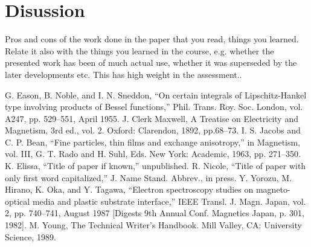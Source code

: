 \documentclass[conference]{IEEEtran}
\begin{document}
\section{Disussion}
Pros and cons of the work done in the paper that you read, things you learned. Relate it also with the things you learned in the course, e.g. whether the presented work has been of much actual use, whether it was superseded by the later developments etc. This has high weight in the assessment..
%
%
%
%
\begin{thebibliography}{00}
 G. Eason, B. Noble, and I. N. Sneddon, ``On certain integrals of Lipschitz-Hankel type involving products of Bessel functions,'' Phil. Trans. Roy. Soc. London, vol. A247, pp. 529--551, April 1955.
 J. Clerk Maxwell, A Treatise on Electricity and Magnetism, 3rd ed., vol. 2. Oxford: Clarendon, 1892, pp.68--73.
 I. S. Jacobs and C. P. Bean, ``Fine particles, thin films and exchange anisotropy,'' in Magnetism, vol. III, G. T. Rado and H. Suhl, Eds. New York: Academic, 1963, pp. 271--350.
 K. Elissa, ``Title of paper if known,'' unpublished.
 R. Nicole, ``Title of paper with only first word capitalized,'' J. Name Stand. Abbrev., in press.
 Y. Yorozu, M. Hirano, K. Oka, and Y. Tagawa, ``Electron spectroscopy studies on magneto-optical media and plastic substrate interface,'' IEEE Transl. J. Magn. Japan, vol. 2, pp. 740--741, August 1987 [Digests 9th Annual Conf. Magnetics Japan, p. 301, 1982].
 M. Young, The Technical Writer's Handbook. Mill Valley, CA: University Science, 1989.
\end{thebibliography}
\vspace{12pt}
\end{document}
